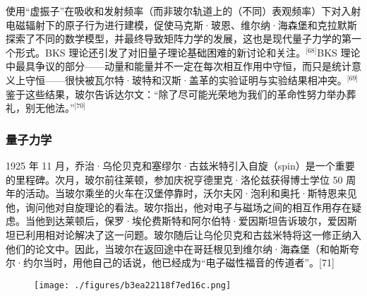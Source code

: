 使用“虚振子”在吸收和发射频率（而非玻尔轨道上的（不同）表观频率）下对入射电磁辐射下的原子行为进行建模，促使马克斯·玻恩、维尔纳·海森堡和克拉默斯探索了不同的数学模型，并最终导致矩阵力学的发展，这也是现代量子力学的第一个形式。BKS 理论还引发了对旧量子理论基础困难的新讨论和关注。\(^\text{[68]}\)BKS 理论中最具争议的部分——动量和能量并不一定在每次相互作用中守恒，而只是统计意义上守恒——很快被瓦尔特·玻特和汉斯·盖革的实验证明与实验结果相冲突。\(^\text{[69]}\)鉴于这些结果，玻尔告诉达尔文：“除了尽可能光荣地为我们的革命性努力举办葬礼，别无他法。”\(^\text{[70]}\)
\subsubsection{量子力学}
1925 年 11 月，乔治·乌伦贝克和塞缪尔·古兹米特引入自旋（spin）是一个重要的里程碑。次月，玻尔前往莱顿，参加庆祝亨德里克·洛伦兹获得博士学位 50 周年的活动。当玻尔乘坐的火车在汉堡停靠时，沃尔夫冈·泡利和奥托·斯特恩来见他，询问他对自旋理论的看法。玻尔指出，他对电子与磁场之间的相互作用存在疑虑。当他到达莱顿后，保罗·埃伦费斯特和阿尔伯特·爱因斯坦告诉玻尔，爱因斯坦已利用相对论解决了这一问题。玻尔随后让乌伦贝克和古兹米特将这一修正纳入他们的论文中。因此，当玻尔在返回途中在哥廷根见到维尔纳·海森堡（和帕斯夸尔·约尔当时，用他自己的话说，他已经成为“电子磁性福音的传道者”。[71]

\begin{figure}[ht]
\centering
\texttt{[image: ./figures/b3ea22118f7ed16c.png]}
\caption{} \label{fig_NRSbr_7}
\end{figure}
